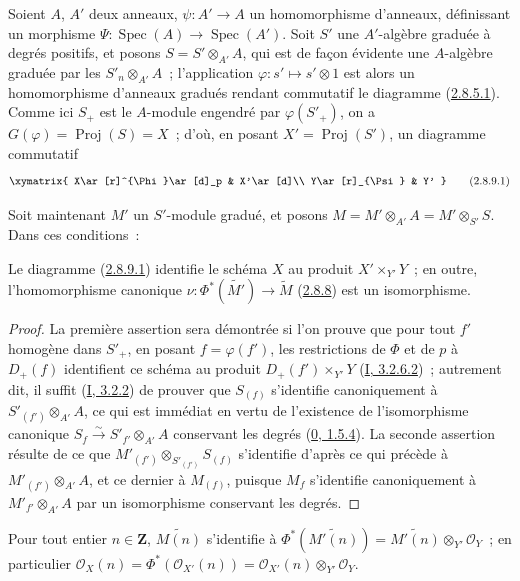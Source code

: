 \begin{env}[2.8.9]
\label{II.2.8.9-fr}
Soient $A$, $A'$ deux anneaux, $\psi:A'\to A$ un homomorphisme d'anneaux,
définissant un morphisme
$\Psi:\operatorname{Spec}(A)\to\operatorname{Spec}(A')$. Soit $S'$ une
$A'$-algèbre graduée à degrés positifs, et posons $S=S'\otimes_{A'}A$, qui
est de façon évidente une $A$-algèbre graduée par les $S'_n\otimes_{A'}A$~;
l'application $\varphi:s'\mapsto s'\otimes1$ est alors un homomorphisme
d'anneaux gradués rendant commutatif le diagramme
(\hyperref[II.2.8.5.1-fr]{2.8.5.1}). Comme ici $S_+$ est le $A$-module
engendré par $\varphi(S'_+)$, on a $G(\varphi)=\operatorname{Proj}(S)=X$~;
d'où, en posant $X'=\operatorname{Proj}(S')$, un diagramme commutatif
\[
\label{II.2.8.9.1-fr}
  \xymatrix{
    X\ar[r]^{\Phi}\ar[d]_p & X'\ar[d]\\
    Y\ar[r]_{\Psi} & Y'
  }
\tag{2.8.9.1}
\]

Soit maintenant $M'$ un $S'$-module gradué, et posons
$M=M'\otimes_{A'}A=M'\otimes_{S'}S$. Dans ces conditions~:
\end{env}

\begin{proposition}[2.8.10]
\label{II.2.8.10-fr}
Le diagramme (\hyperref[II.2.8.9.1-fr]{2.8.9.1}) identifie le schéma $X$ au
produit $X'\times_{Y'}Y$~; en outre, l'homomorphisme canonique
$\nu:\Phi^*(\widetilde{M'})\to\widetilde{M}$
(\hyperref[II.2.8.8-fr]{2.8.8}) est un isomorphisme.
\end{proposition}

\begin{proof}
La première assertion sera démontrée si l'on prouve que pour tout $f'$
homogène dans $S'_+$, en posant $f=\varphi(f')$, les restrictions de $\Phi$
et de $p$ à $D_+(f)$ identifient ce schéma au produit
$D_+(f')\times_{Y'}Y$ (\hyperref[I.3.2.6.2-fr]{I, 3.2.6.2})~; autrement
dit, il suffit (\hyperref[I.3.2.2-fr]{I, 3.2.2}) de prouver que $S_{(f)}$
s'identifie canoniquement à $S'_{(f')}\otimes_{A'}A$, ce qui est immédiat
en vertu de l'existence de l'isomorphisme canonique
$S_f\xrightarrow{\sim}S'_{f'}\otimes_{A'}A$ conservant les degrés
(\hyperref[0.1.5.4-fr]{0, 1.5.4}). La seconde assertion résulte de ce que
$M'_{(f')}\otimes_{S'_{(f')}}S_{(f)}$ s'identifie d'après ce qui précède à
$M'_{(f')}\otimes_{A'}A$, et ce dernier à $M_{(f)}$, puisque $M_f$
s'identifie canoniquement à $M'_{f'}\otimes_{A'}A$ par un isomorphisme
conservant les degrés.
\end{proof}

\begin{corollary}[2.8.11]
\label{II.2.8.11-fr}
Pour tout entier $n\in\mathbf{Z}$, $\widetilde{M(n)}$ s'identifie à
$\Phi^*(\widetilde{M'(n)})=\widetilde{M'(n)}\otimes_{Y'}\mathcal{O}_Y$~;
en particulier
$\mathcal{O}_X(n)=\Phi^*(\mathcal{O}_{X'}(n))
=\mathcal{O}_{X'}(n)\otimes_{Y'}\mathcal{O}_Y$.
\end{corollary}


